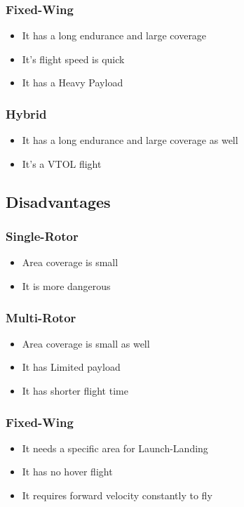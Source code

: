 \documentclass[11pt,twocolumn,letterpaper]{article}
\begin{document}
\subsubsection{Fixed-Wing}
\begin{itemize}
\item It has a long endurance and large coverage
\item It's flight speed is quick
\item It has a Heavy Payload
\end{itemize}

\subsubsection{Hybrid}
\begin{itemize}
\item It has a long endurance and large coverage as well
\item It's a VTOL flight 
\end{itemize}

\subsection{Disadvantages}
\subsubsection{Single-Rotor}
\begin{itemize}
\item Area coverage is small
\item It is more dangerous
\end{itemize}

\subsubsection{Multi-Rotor}
\begin{itemize}
\item Area coverage is small as well
\item It has Limited payload
\item It has shorter flight time
\end{itemize}

\subsubsection{Fixed-Wing}
\begin{itemize}
\item It needs a specific area for Launch-Landing
\item It has no hover flight
\item It requires forward velocity constantly to fly
\end{itemize}
\end{document}
